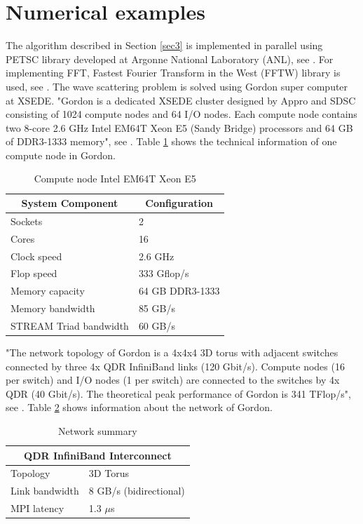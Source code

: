 \documentclass[12pt]{elsarticle}
\numberwithin{equation}{section}
\begin{document}
\section{Numerical examples} \label{sec4}
The algorithm described in Section \ref{sec3} is implemented in parallel using PETSC library developed at Argonne National Laboratory (ANL), see \cite{Petsc}. For implementing FFT, Fastest Fourier Transform in the West (FFTW) library is used, see \cite{FFTW}. The wave scattering problem is solved using Gordon super computer at XSEDE. "Gordon is a dedicated XSEDE cluster designed by Appro and SDSC consisting of 1024 compute nodes and 64 I/O nodes. Each compute node contains two 8-core 2.6 GHz Intel EM64T Xeon E5 (Sandy Bridge) processors and 64 GB of DDR3-1333 memory", see \cite{Gordon}. Table \ref{tab1} shows the technical information of one compute node in Gordon.
\begin{table}[H]
  \centering
  \caption{Compute node Intel EM64T Xeon E5}
    \begin{tabular}{rr}
    \toprule
    \multicolumn{1}{c}{System Component} & \multicolumn{1}{c}{Configuration} \\
    \midrule
    \multicolumn{1}{l}{Sockets} & \multicolumn{1}{l}{2} \\
    \multicolumn{1}{l}{Cores} & \multicolumn{1}{l}{16} \\
    \multicolumn{1}{l}{Clock speed} & \multicolumn{1}{l}{2.6 GHz} \\
    \multicolumn{1}{l}{Flop speed} & \multicolumn{1}{l}{333 Gflop/s} \\
    \multicolumn{1}{l}{Memory capacity} & \multicolumn{1}{l}{64 GB DDR3-1333} \\
    \multicolumn{1}{l}{Memory bandwidth} & \multicolumn{1}{l}{85 GB/s} \\
    \multicolumn{1}{l}{STREAM Triad bandwidth} & \multicolumn{1}{l}{60 GB/s} \\
    \bottomrule
    \end{tabular}%
  \label{tab1}%
\end{table}%
"The network topology of Gordon is a 4x4x4 3D torus with adjacent switches connected by three 4x QDR InfiniBand links (120 Gbit/s). Compute nodes (16 per switch) and I/O nodes (1 per switch) are connected to the switches by 4x QDR (40 Gbit/s). The theoretical peak performance of Gordon is 341 TFlop/s", see \cite{Gordon}. Table \ref{tab2} shows information about the network of Gordon.
\begin{table}[htbp]
  \centering
  \caption{Network summary}
    \begin{tabular}{rr}
    \toprule
    \multicolumn{2}{c}{QDR InfiniBand Interconnect} \\
    \midrule
    \multicolumn{1}{l}{Topology} & \multicolumn{1}{l}{3D Torus} \\
    \multicolumn{1}{l}{Link bandwidth} & \multicolumn{1}{l}{8 GB/s (bidirectional)} \\
    \multicolumn{1}{l}{MPI latency} & \multicolumn{1}{l}{1.3 $\mu$s} \\
    \bottomrule
    \end{tabular}%
  \label{tab2}%
\end{table}%
\end{document}
